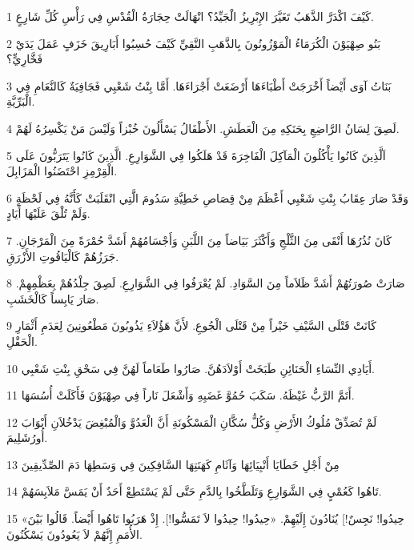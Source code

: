 \par 1 كَيْفَ اكْدَرَّ الذَّهَبُ تَغَيَّرَ الإِبْرِيزُ الْجَيِّدُ؟ انْهَالَتْ حِجَارَةُ الْقُدْسِ فِي رَأْسِ كُلِّ شَارِعٍ.
\par 2 بَنُو صِهْيَوْنَ الْكُرَمَاءُ الْمَوْزُونُونَ بِالذَّهَبِ النَّقِيِّ كَيْفَ حُسِبُوا أَبَارِيقَ خَزَفٍ عَمَلَ يَدَيْ فَخَّارِيٍّ؟
\par 3 بَنَاتُ آوَى أَيْضاً أَخْرَجَتْ أَطْبَاءَهَا أَرْضَعَتْ أَجْرَاءَهَا. أَمَّا بِنْتُ شَعْبِي فَجَافِيَةٌ كَالنَّعَامِ فِي الْبَرِّيَّةِ.
\par 4 لَصِقَ لِسَانُ الرَّاضِعِ بِحَنَكِهِ مِنَ الْعَطَشِ. الأَطْفَالُ يَسْأَلُونَ خُبْزاً وَلَيْسَ مَنْ يَكْسِرُهُ لَهُمْ.
\par 5 اَلَّذِينَ كَانُوا يَأْكُلُونَ الْمَآكِلَ الْفَاخِرَةَ قَدْ هَلَكُوا فِي الشَّوَارِعِ. الَّذِينَ كَانُوا يَتَرَبُّونَ عَلَى الْقِرْمِزِ احْتَضَنُوا الْمَزَابِلَ.
\par 6 وَقَدْ صَارَ عِقَابُ بِنْتِ شَعْبِي أَعْظَمَ مِنْ قِصَاصِ خَطِيَّةِ سَدُومَ الَّتِي انْقَلَبَتْ كَأَنَّهُ فِي لَحْظَةٍ وَلَمْ تُلْقَ عَلَيْهَا أَيَادٍ.
\par 7 كَانَ نُذُرُهَا أَنْقَى مِنَ الثَّلْجِ وَأَكْثَرَ بَيَاضاً مِنَ اللَّبَنِ وَأَجْسَامُهُمْ أَشَدَّ حُمْرَةً مِنَ الْمَرْجَانِ. جَرَزُهُمْ كَالْيَاقُوتِ الأَزْرَقِ.
\par 8 صَارَتْ صُورَتُهُمْ أَشَدَّ ظَلاَماً مِنَ السَّوَادِ. لَمْ يُعْرَفُوا فِي الشَّوَارِعِ. لَصِقَ جِلْدُهُمْ بِعَظْمِهِمْ. صَارَ يَابِساً كَالْخَشَبِ.
\par 9 كَانَتْ قَتْلَى السَّيْفِ خَيْراً مِنْ قَتْلَى الْجُوعِ. لأَنَّ هَؤُلاَءِ يَذُوبُونَ مَطْعُونِينَ لِعَدَمِ أَثْمَارِ الْحَقْلِ.
\par 10 أَيَادِي النِّسَاءِ الْحَنَائِنِ طَبَخَتْ أَوْلاَدَهُنَّ. صَارُوا طَعَاماً لَهُنَّ فِي سَحْقِ بِنْتِ شَعْبِي.
\par 11 أَتَمَّ الرَّبُّ غَيْظَهُ. سَكَبَ حُمُوَّ غَضَبِهِ وَأَشْعَلَ نَاراً فِي صِهْيَوْنَ فَأَكَلَتْ أُسُسَهَا.
\par 12 لَمْ تُصَدِّقْ مُلُوكُ الأَرْضِ وَكُلُّ سُكَّانِ الْمَسْكُونَةِ أَنَّ الْعَدُوَّ وَالْمُبْغِضَ يَدْخُلاَنِ أَبْوَابَ أُورُشَلِيمَ.
\par 13 مِنْ أَجْلِ خَطَايَا أَنْبِيَائِهَا وَآثَامِ كَهَنَتِهَا السَّافِكِينَ فِي وَسَطِهَا دَمَ الصِّدِّيقِينَ
\par 14 تَاهُوا كَعُمْيٍ فِي الشَّوَارِعِ وَتَلَطَّخُوا بِالدَّمِ حَتَّى لَمْ يَسْتَطِعْ أَحَدٌ أَنْ يَمَسَّ مَلاَبِسَهُمْ.
\par 15 «حِيدُوا! نَجِسٌ!] يُنَادُونَ إِلَيْهِمْ. «حِيدُوا! حِيدُوا لاَ تَمَسُّوا!]. إِذْ هَرَبُوا تَاهُوا أَيْضاً. قَالُوا بَيْنَ الأُمَمِ إِنَّهُمْ لاَ يَعُودُونَ يَسْكُنُونَ.
